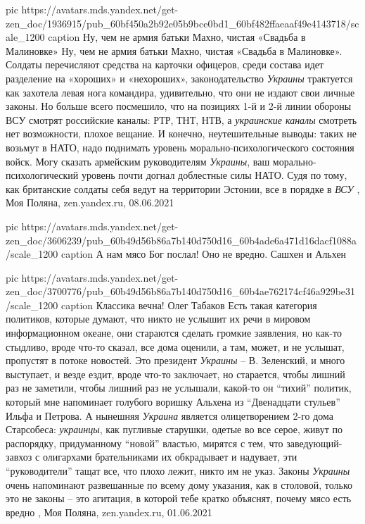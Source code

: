\ifcmt
  pic https://avatars.mds.yandex.net/get-zen_doc/1936915/pub_60bf450a2b92e05b9bce0bd1_60bf482ffaeaaf49e4143718/scale_1200
	caption Ну, чем не армия батьки Махно, чистая «Свадьба в Малиновке»
\fi
Ну, чем не армия батьки Махно, чистая «Свадьба в Малиновке». Солдаты
перечисляют средства на карточки офицеров, среди состава идет разделение на
«хороших» и «нехороших», законодательство \emph{Украины} трактуется как захотела левая
нога командира, удивительно, что они не издают свои личные законы. Но больше
всего посмешило, что на позициях 1-й и 2-й линии обороны ВСУ смотрят российские
каналы: РТР, ТНТ, НТВ, а \emph{украинские каналы} смотреть нет возможности, плохое
вещание.  И конечно, неутешительные выводы: таких не возьмут в НАТО, надо
поднимать уровень морально-психологического состояния войск.  Могу сказать
армейским руководителям \emph{Украины}, ваш морально-психологический уровень почти
догнал доблестные силы НАТО. Судя по тому, как британские солдаты себя ведут на
территории Эстонии, все в порядке в \emph{ВСУ}
, 
Моя Поляна, zen.yandex.ru, 08.06.2021

\ifcmt
  pic https://avatars.mds.yandex.net/get-zen_doc/3606239/pub_60b49d56b86a7b140d750d16_60b4ade6a471d16dacf1088a/scale_1200
	caption А нам мясо Бог послал! Оно не вредно. Сашхен и Альхен

	pic https://avatars.mds.yandex.net/get-zen_doc/3700776/pub_60b49d56b86a7b140d750d16_60b4ae762174cf46a929be31/scale_1200
	caption Классика вечна! Олег Табаков
\fi
Есть такая категория политиков, которые думают, что никто не услышит их речи в
мировом информационном океане, они стараются сделать громкие заявления, но
как-то стыдливо, вроде что-то сказал, все дома оценили, а там, может, и не
услышат, пропустят в потоке новостей.  Это президент \emph{Украины} – В. Зеленский, и
много выступает, и везде ездит, вроде что-то заключает, но старается, чтобы
лишний раз не заметили, чтобы лишний раз не услышали, какой-то он \enquote{тихий}
политик, который мне напоминает голубого воришку Альхена из \enquote{Двенадцати
стульев} Ильфа и Петрова. А нынешняя \emph{Украина} является олицетворением 2-го дома
Старсобеса: \emph{украинцы}, как пугливые старушки, одетые во все серое, живут по
распорядку, придуманному \enquote{новой} властью, мирятся с тем, что заведующий-завхоз
с олигархами брательниками их обкрадывает и надувает, эти \enquote{руководители} тащат
все, что плохо лежит, никто им не указ. Законы \emph{Украины} очень напоминают
развешанные по всему дому указания, как в столовой, только это не законы – это
агитация, в которой тебе кратко объяснят, почему мясо есть вредно
, Моя Поляна, zen.yandex.ru, 01.06.2021

